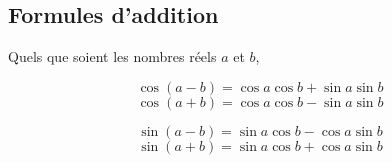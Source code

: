 \documentclass[french]{book}
\begin{document}
\subsection{Formules d'addition}
\begin{prop}
Quels que soient les nombres r\'eels $a$ et $b$,\\

\vspace{-1ex}
\begin{minipage}{0.48\linewidth}
\begin{equation}
\cos(a-b)=\cos a \cos b + \sin a \sin b
\end{equation}
\begin{equation}
\cos(a+b)=\cos a \cos b - \sin a \sin b
\end{equation}
\end{minipage}
\begin{minipage}{0.48\linewidth}
\begin{equation}
\sin(a-b)=\sin a \cos b - \cos a \sin b
\end{equation}
\begin{equation}
\sin(a+b)=\sin a \cos b + \cos a \sin b
\end{equation}
\end{minipage}
\end{prop}
\end{document}
